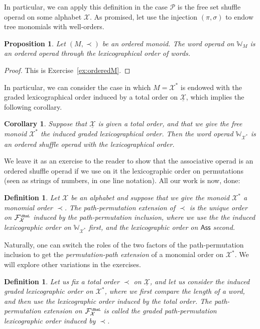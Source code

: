 \documentclass[fleqn, a4paper, twoside]{article}
\newcommand{\Sha}{{\scaleobj{0.75}{\ShaL}}}
\newcommand{\0}{\langle 0\rangle}
\newcommand{\XX}{\mathcal{X}}
\newcommand{\FF}{\mathcal{F}}
\DeclareRobustCommand{\[}{\begin{equation}}%
\DeclareRobustCommand{\]}{\end{equation}}%
\theoremstyle{mytheorem}
\newtheorem{proposition}[theorem]{Proposition}
\newtheorem{corollary}[theorem]{Corollary}
\theoremstyle{introthm}
\theoremstyle{mydefinition}
\newtheorem{definition}[theorem]{Definition}
\theoremstyle{mydefinition2}
\theoremstyle{plain} %
\newcommand{\?}{\,?\,}
\newcommand{\PP}{{\mathcal{P}}}
\theoremstyle{mytheorem}
\theoremstyle{plain} %
\begin{document}
In particular, we can apply this definition in the case $\PP$
is the free set shuffle operad on some alphabet $\XX$. As
promised, let use 
the injection $(\pi,\sigma)$ to endow tree monomials with
well-orders. 

\begin{proposition}
Let $(M,\prec)$ be an ordered monoid. The
word operad on $\mathbb W_M$ is an ordered operad
through the lexicographical order of words.
\end{proposition}

\begin{proof}
This is Exercise~\ref{ex:orderedM}.
\end{proof}

In particular, we can consider the case in which $M = \XX^*$
is endowed with the graded lexicographical order induced by
a total order on $\underline{\XX}$, which implies the following
corollary.

\begin{corollary}
Suppose that $\underline{\XX}$ is given a total order, and that
we give the free monoid $\XX^*$ the induced graded 
lexicographical order. Then
the word operad $\mathbb{W}_{\XX^*}$ is an ordered
shuffle operad with the lexicographical order.
\end{corollary}

We leave it as an exercise to the reader to show that the
associative operad is an ordered shuffle operad if we
use on it the lexicographic order on permutations
(seen as strings of numbers, in one line notation).
All our work is now, done:

\begin{definition}
Let $\XX$ be an alphabet and suppose that we
give the monoid $\XX^*$ a monomial order $\prec$.
The \emph{path-permutation extension} of $\prec$ is the
unique order on $\FF_{\XX}^\Sha$ induced by
the path-permutation inclusion, where we use the
the induced lexicographic
order on $\mathbb{W}_{\XX^*}$ first, and the
lexicographic order on $\mathsf{Ass}$ second.
\end{definition}

Naturally, one can switch the roles of the two
factors of the path-permutation inclusion to get
the \emph{permutation-path extension} of a monomial
order on $\XX^*$. We will explore other variations
in the exercises.

\begin{definition}
Let us fix a total order $\prec$ on $\underline{\XX}$, and let us
consider the induced graded lexicographic order on 
$\XX^*$, where we first compare the length of a 
word, and then use the lexicographic order induced
by the total order. The path-permutation extension 
on $\FF_\XX^\Sha$ is called the  \emph{graded path-permutation 
lexicographic order} induced by $\prec$.
\end{definition}
\end{document}
